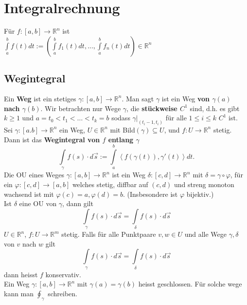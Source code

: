 \section{Integralrechnung}
  Für $f:[a,b]\rightarrow\mathbb R^n$ ist\\
  $\int\limits_a^bf(t)dt:=\left(\int\limits_a^bf_1(t)dt,...,\int\limits_a^bf_n(t)dt\right)\in\mathbb
  R^n$
\subsection{Wegintegral}
    Ein \textbf{Weg} ist ein stetiges $\gamma:[a,b]\rightarrow\mathbb R^n$. Man sagt
    $\gamma$ ist ein Weg \textbf{von $\gamma(a)$ nach $\gamma(b)$}. Wir betrachten
    nur Wege $\gamma$, die \textbf{stückweise $C^1$} sind, d.h. es gibt $k\geq1$
    und $a=t_0<t_1<\dots<t_k=b$ sodass $\gamma|_{(t_i-1,t_i)}$ für alle $1\leq i
    \leq k$ $C^1$ ist.\\
    Sei $\gamma:[a.b]\rightarrow\mathbb R^n$ ein Weg, $U\in\mathbb R^n$ mit
    Bild$(\gamma)\subseteq U$, und $f: U\rightarrow \mathbb R^n$ stetig. Dann
    ist das \textbf{Wegintegral von $f$ entlang $\gamma$} $$\int\limits_\gamma f(s)\cdot
    d\overrightarrow{s}:= \int\limits_a^b\left<f(\gamma(t)),\gamma'(t)\right>dt.$$
    Die OU eines Weges $\gamma:[a,b]\rightarrow\mathbb R^n$ ist ein Weg
    $\delta:[c,d]\rightarrow\mathbb R^n$ mit $\delta=\gamma\circ\varphi$, für ein
    $\varphi:[c,d]\rightarrow[a,b]$ welches stetig, diffbar auf $(c,d)$ und
    streng monoton wachsend ist mit $\varphi(c)=a, \varphi(d)=b$. (Insbesondere ist 
    $\varphi$ bijektiv.)\\
    Ist $\delta$ eine OU von $\gamma$, dann gilt $$\int\limits_\gamma f(s)\cdot
    d\overrightarrow{s}=\int\limits_\delta f(s)\cdot d\overrightarrow{s}$$
    $U\in\mathbb R^n$, $f:U\rightarrow\mathbb R^m$ stetig. Falls für alle
    Punktpaare $v,w\in U$ und alle Wege $\gamma,\delta$ von $v$ nach $w$ gilt
    $$\int\limits_\gamma f(s)\cdot d\overrightarrow{s}=\int\limits_\delta f(s)\cdot
    d\overrightarrow{s}$$ dann heisst $f$ konservativ.\\
    Ein Weg $\gamma:[a,b]\rightarrow\mathbb R^n$ mit $\gamma(a)=\gamma(b)$
    heisst geschlossen. Für solche wege kann man $\oint_\gamma$ schreiben.\\
